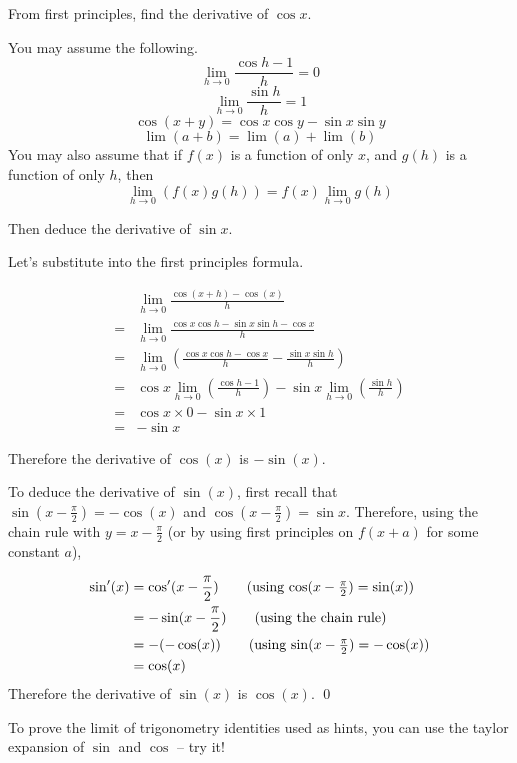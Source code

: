 \begin{example}

    From first principles, find the derivative of $\cos x$.
    
    You may assume the following.
    \[ \lim_{h\rightarrow 0}\frac{\cos h-1}{h}=0\]
    \[ \lim_{h\rightarrow 0}\frac{\sin h}{h}=1\]
    \[ \cos(x+y) = \cos x \cos y - \sin x \sin y\]
    \[ \lim(a+b) = \lim(a) + \lim(b)\]
    You may also assume that if $f(x)$ is a function of only $x$, and $g(h)$ is a function of only $h$, then 
    \[ \lim_{h \rightarrow 0} \left(f(x)g(h)\right) = f(x)\lim_{h \rightarrow 0} g(h) \]

    Then deduce the derivative of $\sin x$.
\end{example}
\begin{solution}
    Let's substitute into the first principles formula.

    \begin{align*}
         &\lim_{h\rightarrow 0}  \frac{\cos(x+h) - \cos(x)}{h} \tag{definition of derivative}\\
        =&\lim_{h\rightarrow 0}  \frac{\cos x \cos h - \sin x \sin h - \cos x}{h} \tag{using the third hint}\\
        =& \lim_{h\rightarrow 0}  \left(\frac{\cos x \cos h - \cos x}{h} - \frac{ \sin x \sin h }{h} \right) \tag{separate the fraction}\\
        =& \cos x  \lim_{h\rightarrow 0}  \left(\frac{\cos h - 1}{h} \right) - \sin x  \lim_{h\rightarrow 0}  \left(\frac{\sin h}{h}\right) \tag{fourth and fifth hint}\\
        =& \cos x \times 0 - \sin x \times 1 \tag{first and second hint} \\
        =& -\sin x
    \end{align*}

    Therefore the derivative of $\cos(x)$ is $-\sin(x)$.

    To deduce the derivative of $\sin(x)$, first recall that $\sin(x-\frac{\pi}{2})=-\cos(x)$ and $\cos\left(x-\frac{\pi}{2}\right) = \sin x$. Therefore, using the chain rule with $y = x-\frac{\pi}{2}$ (or by using first principles on $f(x+a)$ for some constant $a$),

    \begin{align*}
        \sin'(x) &= \cos'(x-\frac{\pi}{2}) \tag{using $\cos(x-\frac{\pi}{2})=\sin(x)$} \\
         &= -\sin (x- \frac{\pi}{2}) \tag{using the chain rule} \\
         &= - (-\cos (x)) \tag{using $\sin(x-\frac{\pi}{2})=-\cos(x)$} \\
         &= \cos (x)
    \end{align*}
    Therefore the derivative of $\sin(x)$ is $\cos(x)$.
    \qed
\end{solution}
To prove the limit of trigonometry identities used as hints, you can use the taylor expansion of $\sin$ and $\cos$ -- try it!



